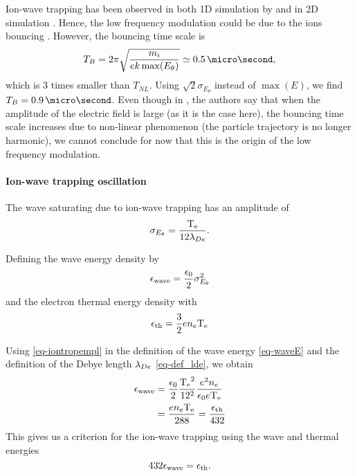     Ion-wave trapping has been observed in both \ac{1D} simulation by \citet{lafleur2016a} and in \ac{2D} simulation \citep{croes2017a}.
    Hence, the low frequency modulation could be due to the ions bouncing \citep{belmont2013}.
    However, the bouncing time scale is 
    \begin{equation} \label{eq-TB}
      T_{B} = 2 \pi \sqrt{\frac{m_i}{e k \max(E_{\theta})} } \simeq 0.5 \,\micro\second,
    \end{equation}
    which is 3 times smaller than $T_{NL}$.
    Using $\sqrt{2} \sigma_{E_{\theta}}$ instead of $\max(E)$, we find $T_B = 0.9\,\micro\second$.
    Even though in \citet{belmont2013}, the authors say that when the amplitude of the electric field is large (as it is the case here), the bouncing time scale increases due to non-linear phenomenon (the particle trajectory is no longer harmonic), we cannot conclude for now that this is the origin of the low frequency modulation.

  
  \paragraph{Ion-wave trapping oscillation\\}
    The wave saturating due to ion-wave trapping has an amplitude of \citep{lafleur2017,boeuf2018}
     \begin{equation} \label{eq-iontropempl}
       \sigma_{E_{\theta}} = \frac{\mathrm{T_e}}{12 \lambda_{De}}.
     \end{equation}
    
    Defining the wave energy  density by
    \begin{equation} \label{eq-waveE}
      \epsilon_{\rm wave} = \frac{\epsilon_0}{2} \sigma_{E_{\theta}}^2
    \end{equation}
    and the electron thermal energy density with
    \begin{equation} \label{eq-thE}
      \epsilon_{\rm th} = \frac{3}{2} e n_e \mathrm{T_e}
    \end{equation}
    
    Using \cref{eq-iontropempl} in the definition of the wave energy \cref{eq-waveE} and the definition of the Debye length $\lambda_{De}$ \cref{eq-def_lde}, we obtain
    \begin{align*} \label{eq-step_1}
      \epsilon_{\rm wave} &=  \frac{\epsilon_0}{2} \frac{\mathrm{T_e}^2}{12^2} \frac{e^2 n_e}{ \epsilon_0 e\mathrm{T_e}}\\
      &= \frac{e n_e \mathrm{T_e} }{288} = \frac{\epsilon_{\rm th}}{432}
    \end{align*}
    This gives us a criterion for the ion-wave trapping using the wave and thermal energies
    \begin{equation} \label{eq-criteriaIT}
      432 \epsilon_{\rm wave} = \epsilon_{\rm th}.
    \end{equation}
    
